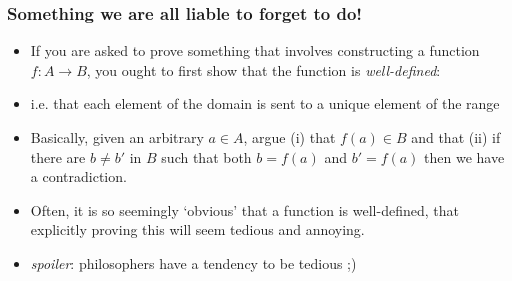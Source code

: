 \begin{frame}
\frametitle{Something we are all liable to forget to do!}

\begin{itemize}[<+->]

\item If you are asked to prove something that involves constructing a function $f: A \rightarrow B$, you ought to first show that the function is \emph{well-defined}:

\item i.e. that each element of the domain is sent to a unique element of the range

\item Basically, given an arbitrary $a \in A$, argue (i) that $f(a) \in B$ and that (ii) if there are $b \neq b'$ in $B$ such that both $b = f(a)$ and $b' = f(a)$ then we have a contradiction. 

\item Often, it is so seemingly `obvious' that a function is well-defined, that explicitly proving this will seem tedious and annoying.

\item[] \textit{spoiler}: philosophers have a tendency to be tedious ;) 




\end{itemize}
\end{frame}

